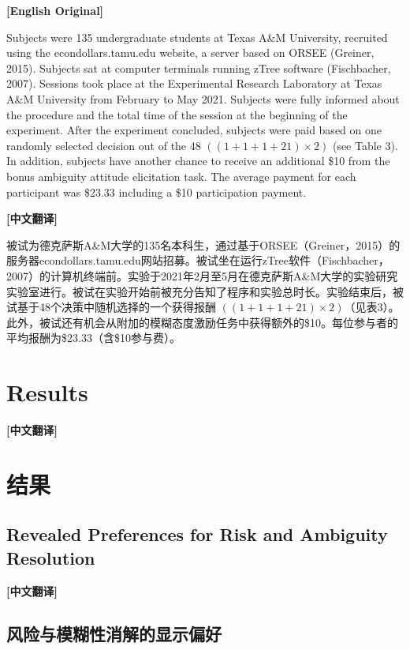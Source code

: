 \documentclass[12pt,a4paper]{ctexart}
\newenvironment{original}{%
  \par\medskip\noindent\textbf{[English Original]}\par\smallskip
  \color{black}\small
}{%
  \par\medskip
}
\newenvironment{translation}{%
  \par\noindent\textbf{[中文翻译]}\par\smallskip
  \color{blue}\small
}{%
  \par\bigskip
}
\theoremstyle{definition}
\theoremstyle{remark}
\begin{document}
\begin{original}
Subjects were 135 undergraduate students at Texas A\&M University, recruited using the econdollars.tamu.edu website, a server based on ORSEE (Greiner, 2015). Subjects sat at computer terminals running zTree software (Fischbacher, 2007). Sessions took place at the Experimental Research Laboratory at Texas A\&M University from February to May 2021. Subjects were fully informed about the procedure and the total time of the session at the beginning of the experiment. After the experiment concluded, subjects were paid based on one randomly selected decision out of the 48 $((1+1+1+21)\times 2)$ (see Table 3). In addition, subjects have another chance to receive an additional \$10 from the bonus ambiguity attitude elicitation task. The average payment for each participant was \$23.33 including a \$10 participation payment.
\end{original}
\begin{translation}
被试为德克萨斯A\&M大学的135名本科生，通过基于ORSEE（Greiner，2015）的服务器econdollars.tamu.edu网站招募。被试坐在运行zTree软件（Fischbacher，2007）的计算机终端前。实验于2021年2月至5月在德克萨斯A\&M大学的实验研究实验室进行。被试在实验开始前被充分告知了程序和实验总时长。实验结束后，被试基于48个决策中随机选择的一个获得报酬 $((1+1+1+21)\times 2)$（见表3）。此外，被试还有机会从附加的模糊态度激励任务中获得额外的\$10。每位参与者的平均报酬为\$23.33（含\$10参与费）。
\end{translation}

\newpage

\section{Results}
\begin{translation}
\section*{结果}
\end{translation}

\subsection{Revealed Preferences for Risk and Ambiguity Resolution}
\begin{translation}
\subsection*{风险与模糊性消解的显示偏好}
\end{translation}
\end{document}
